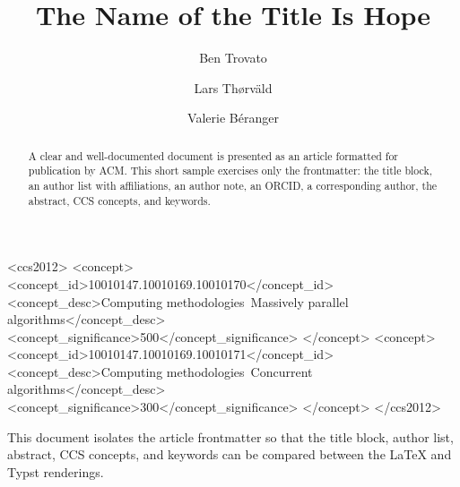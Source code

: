 \documentclass[acmsmall]{acmart}
\begin{document}
\title{The Name of the Title Is Hope}

\author{Ben Trovato}

\author{Lars Th{\o}rv{\"a}ld}
\correspondingauthor
{}

\author{Valerie B\'eranger}

\renewcommand{\shortauthors}{Trovato et al.}

\begin{abstract}
  A clear and well-documented document is presented as an article formatted for
  publication by ACM. This short sample exercises only the frontmatter: the
  title block, an author list with affiliations, an author note, an ORCID, a
  corresponding author, the abstract, CCS concepts, and keywords.
\end{abstract}

\begin{CCSXML}
<ccs2012>
 <concept>
  <concept_id>10010147.10010169.10010170</concept_id>
  <concept_desc>Computing methodologies~Massively parallel algorithms</concept_desc>
  <concept_significance>500</concept_significance>
 </concept>
 <concept>
  <concept_id>10010147.10010169.10010171</concept_id>
  <concept_desc>Computing methodologies~Concurrent algorithms</concept_desc>
  <concept_significance>300</concept_significance>
 </concept>
</ccs2012>
\end{CCSXML}



\maketitle

This document isolates the article frontmatter so that the title block, author
list, abstract, CCS concepts, and keywords can be compared between the LaTeX and
Typst renderings.
\end{document}
